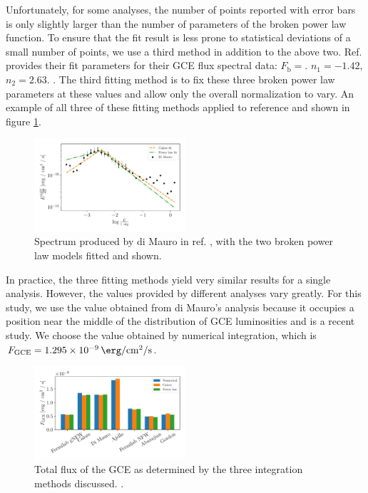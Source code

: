 \documentclass[a4paper,11pt]{article}
\newcommand{\comment}[1]{\emph{\color{red}{#1}}}
\begin{document}
Unfortunately, for some analyses, the number of points reported with error bars is only slightly larger than the number of parameters of the broken power law function. To ensure that the fit result is less prone to statistical deviations of a small number of points, we use a third method in addition to the above two. Ref. \cite{Calore:2014xka} provides their fit parameters for their GCE flux spectral data: $F_\text{b} = $. $n_1 = -1.42$, $n_2 = 2.63$. \comment{Check for sign errors in the original. Also get the flux they provide.}. The third fitting method is to fix these three broken power law parameters at these values and allow only the overall normalization to vary. An example of all three of these fitting methods applied to reference \cite{DiMauro:2021raz} and shown in figure \ref{fig:di-mauro-example}.

\begin{figure}
    \centering
    \includegraphics[width=0.5\textwidth]{figs/di-mauro-example.pdf}
    \caption{Spectrum produced by di Mauro in ref. \cite{DiMauro:2021raz}, with the two broken power law models fitted and shown.}
    \label{fig:di-mauro-example}
\end{figure}

In practice, the three fitting methods yield very similar results for a single analysis. However, the values provided by different analyses vary greatly. For this study, we use the value obtained from di Mauro's analysis because it occupies a position near the middle of the distribution of GCE luminosities and is a recent study. We choose the value obtained by numerical integration, which is $F_\text{GCE} = \SI{1.295e-9}{\erg\per\centi\meter\squared\per\second}$.

\comment{Discuss how rescaling of the ROI was done}

\begin{figure}
    \centering
    \includegraphics[width=0.5\textwidth]{figs/total-flux-bars.pdf}
    \caption{Total flux of the GCE as determined by the three integration methods discussed. \comment{Here I would discuss why Ajello doesn't have a value for the power law case if this is still true once I have the original source}.}
    \label{fig:total-flux-bars}
\end{figure}
\end{document}
